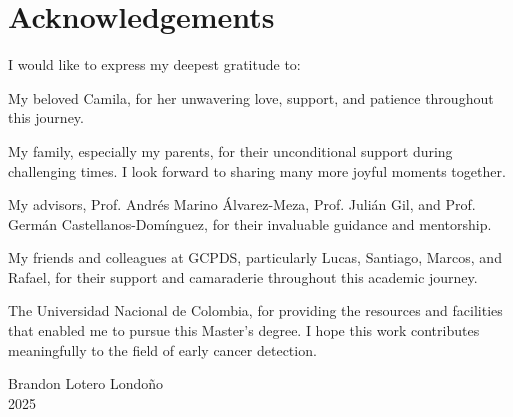 \cleardoublepage
\chapter*{Acknowledgements}

I would like to express my deepest gratitude to:

My beloved Camila, for her unwavering love, support, and patience
throughout this journey.

My family, especially my parents, for their unconditional support
during challenging times. I look forward to sharing many more joyful
moments together.

My advisors, Prof. Andrés Marino Álvarez-Meza, Prof. Julián Gil, and
Prof. Germán Castellanos-Domínguez, for their invaluable guidance and
mentorship.

My friends and colleagues at GCPDS, particularly Lucas, Santiago,
Marcos, and Rafael, for their support and camaraderie throughout this
academic journey.

The Universidad Nacional de Colombia, for providing the resources and
facilities that enabled me to pursue this Master's degree. I hope
this work contributes meaningfully to the field of early cancer detection.

\begin{flushright}
  Brandon Lotero Londoño\\
  2025
\end{flushright}
